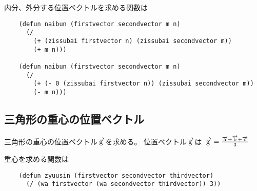 \documentclass[a4paper]{jsarticle}
\newcommand{\bekutoru}[1]{\overrightarrow{\rm #1}}
\begin{document}
\begin{boxnote}
  内分、外分する位置ベクトルを求める関数は
  \begin{lstlisting}
    (defun naibun (firstvector secondvector m n)
      (/
        (+ (zissubai firstvector n) (zissubai secondvector m))
        (+ m n)))

    (defun naibun (firstvector secondvector m n)
      (/
        (+ (- 0 (zissubai firstvector n)) (zissubai secondvector m))
        (- m n)))
  \end{lstlisting}
\end{boxnote}

\subsection*{三角形の重心の位置ベクトル}

三角形の重心の位置ベクトル$\bekutoru{g}$を求める。
位置ベクトル$\bekutoru{g}$は
$\bekutoru{g}=\frac{\bekutoru{a}+\bekutoru{b}+\bekutoru{c}}{3}$

\begin{boxnote}
  重心を求める関数は
  \begin{lstlisting}
    (defun zyuusin (firstvector secondvector thirdvector)
      (/ (wa firstvector (wa secondvector thirdvector)) 3))
  \end{lstlisting}
\end{boxnote}
\end{document}
